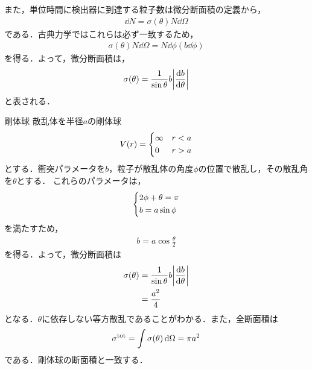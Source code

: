 \documentclass{report}
\begin{document}
  また，単位時間に検出器に到達する粒子数は微分断面積の定義から，
  \begin{align}
    \dd{N} = \sigma (\theta) N \dd{\Omega}
  \end{align}
  である．古典力学ではこれらは必ず一致するため，
  \begin{align}
    \sigma (\theta) N \dd{\Omega} = N \dd{\phi} (b \dd{\phi})
  \end{align}
  を得る．よって，微分断面積は，
  \begin{align}
    \sigma(\theta) = \frac{1}{\sin \theta} b \abs{\frac{\dd{b}}{\dd{\theta}}}
  \end{align}
  と表される．
  \begin{myex}{剛体球}{}
    散乱体を半径$a$の剛体球
    \begin{align}
      V(r) = 
      \begin{dcases}
        \infty & r < a \\
        0 & r > a
      \end{dcases}
    \end{align}
    とする．衝突パラメータを$b$，粒子が散乱体の角度$\phi$の位置で散乱し，その散乱角を$\theta$とする．
    これらのパラメータは，
    \begin{align}
      \begin{dcases}
        2\phi + \theta = \pi\\
        b = a\sin \phi
      \end{dcases}
    \end{align}
    を満たすため，
    \begin{align}
      b = a\cos \frac{\theta}{2}
    \end{align}
    を得る．よって，微分断面積は
    \begin{align}
    \sigma(\theta) &= \frac{1}{\sin \theta} b \abs{\frac{\dd{b}}{\dd{\theta}}}\\
    &= \frac{a^2}{4}
    \end{align}
    となる．$\theta$に依存しない等方散乱であることがわかる．また，全断面積は
    \begin{align}
      \sigma^{\mathrm{tot}} = \int \sigma(\theta) \dd{\Omega} = \pi a^2
    \end{align}
    である．剛体球の断面積と一致する．
  \end{myex}
\end{document}
